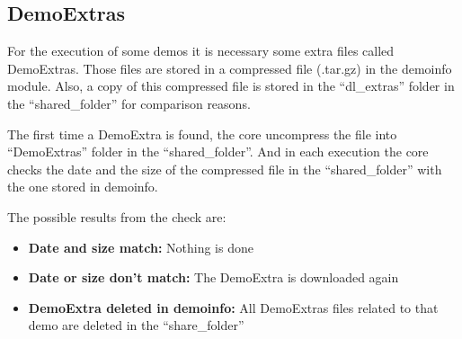 \subsection{DemoExtras}

For the execution of some demos it is necessary some extra files called DemoExtras. Those files are stored in a compressed file (.tar.gz)
in the demoinfo module. Also, a copy of this compressed file is stored in the ``dl\_extras'' folder in the ``shared\_folder'' for comparison
reasons.

The first time a DemoExtra is found, the core uncompress the file into ``DemoExtras'' folder in the ``shared\_folder''. And in each execution
the core checks the date and the size of the compressed file in the ``shared\_folder'' with the one stored in demoinfo.

The possible results from the check are:
\begin{itemize}
 \item \textbf{Date and size match:} Nothing is done
 \item \textbf{Date or size don't match:} The DemoExtra is downloaded again
 \item \textbf{DemoExtra deleted in demoinfo:} All DemoExtras files related to that demo are deleted in the ``share\_folder''
\end{itemize}

